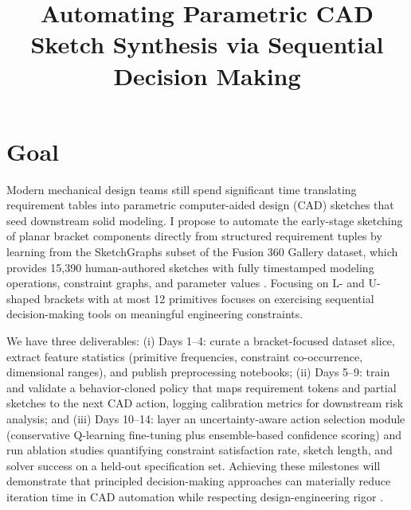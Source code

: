 \documentclass[twoside,11pt]{article}
\begin{document}
\title{Automating Parametric CAD Sketch Synthesis via Sequential Decision Making}
\newcommand{\shorttitle}{Automating CAD Sketches} 


\maketitle

\section{Goal}
Modern mechanical design teams still spend significant time translating requirement tables into parametric computer-aided design (CAD) sketches that seed downstream solid modeling. I propose to automate the early-stage sketching of planar bracket components directly from structured requirement tuples by learning from the SketchGraphs subset of the Fusion 360 Gallery dataset, which provides 15{,}390 human-authored sketches with fully timestamped modeling operations, constraint graphs, and parameter values \citep{Willis2021Fusion360, SketchGraphs2020}. Focusing on L- and U-shaped brackets with at most 12 primitives focuses on exercising sequential decision-making tools on meaningful engineering constraints.

We have three deliverables: (i) Days 1--4: curate a bracket-focused dataset slice, extract feature statistics (primitive frequencies, constraint co-occurrence, dimensional ranges), and publish preprocessing notebooks; (ii) Days 5--9: train and validate a behavior-cloned policy that maps requirement tokens and partial sketches to the next CAD action, logging calibration metrics for downstream risk analysis; and (iii) Days 10--14: layer an uncertainty-aware action selection module (conservative Q-learning fine-tuning plus ensemble-based confidence scoring) and run ablation studies quantifying constraint satisfaction rate, sketch length, and solver success on a held-out specification set. Achieving these milestones will demonstrate that principled decision-making approaches can materially reduce iteration time in CAD automation while respecting design-engineering rigor \citep{Kochenderfer2022}.
\end{document}
